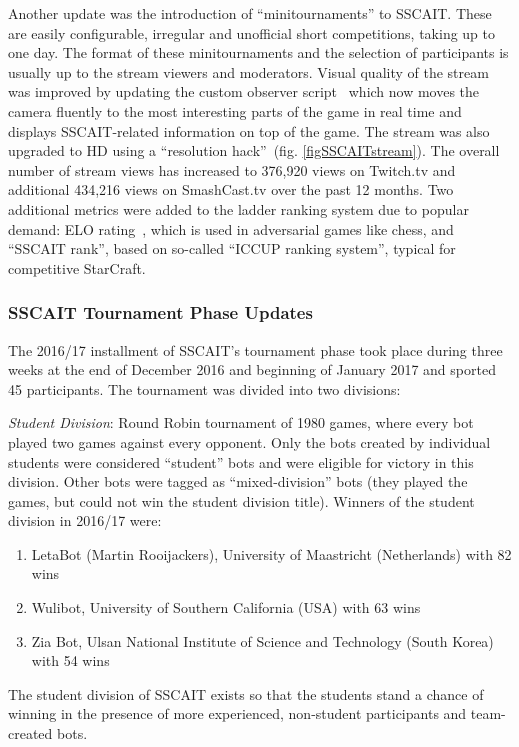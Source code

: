 Another update was the introduction of ``minitournaments'' to SSCAIT. These are easily configurable, irregular and unofficial short competitions, taking up to one day. The format of these minitournaments and the selection of participants is usually up to the stream viewers and moderators. Visual quality of the stream was improved by updating the custom observer script~\cite{mattsson2015automatic} which now moves the camera fluently to the most interesting parts of the game in real time and displays SSCAIT-related information on top of the game. The stream was also upgraded to HD using a ``resolution hack''~(fig. \ref{figSSCAITstream}). 
The overall number of stream views has increased to 376,920 views on Twitch.tv and additional 434,216 views on SmashCast.tv over the past 12 months. Two additional metrics were added to the ladder ranking system due to popular demand: ELO rating~\cite{elo1978rating}, which is used in adversarial games like chess, and ``SSCAIT rank'', based on so-called ``ICCUP ranking system'', typical for competitive StarCraft.

\subsubsection*{SSCAIT Tournament Phase Updates}

The 2016/17 installment of SSCAIT's tournament phase took place during three weeks at the end of December 2016 and beginning of January 2017 and sported 45 participants. The tournament was divided into two divisions:

\emph{Student Division}: Round Robin tournament of 1980 games, where every bot played two games against every opponent. Only the bots created by individual students were considered ``student'' bots and were eligible for victory in this division. Other bots were tagged as ``mixed-division'' bots (they played the games, but could not win the student division title). Winners of the student division in 2016/17 were:
  \begin{enumerate}
	\item LetaBot (Martin Rooijackers), University of Maastricht (Netherlands) with 82 wins
	\item Wulibot, University of Southern California (USA) with 63 wins
	\item Zia Bot, Ulsan National Institute of Science and Technology (South Korea) with 54 wins
  \end{enumerate}
The student division of SSCAIT exists so that the students stand a chance of winning in the presence of more experienced, non-student participants and team-created bots.

